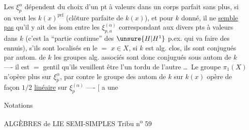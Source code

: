 Les $\xi_p^\alpha$ dépendent du choix d'un  pt  à valeurs dans un corps parfait sans plus, si on veut les $k(x)^{\mathrm{prf}}$\deleted{\unsure{,}} (clôture parfaite de $k(x)$), et pour $k$ donné, il ne \uline{semble pas} qu'il y ait  des isom entre les $\xi_{p,a}^{(\alpha)}$ correspondant aux divers pts à valeurs dans $k$ (c'est la ``partie continue'' des $\unsure{H|H^1}$ p.ex. qui va faire des ennuis), s'ils sont localisés en le $=$ $x\in X$,   si $k$ est alg. clos, ils sont conjugués par autom. de $k$  les groupes alg. associés sont donc conjugués sous autom de $k$ ---- il est $=$ gentil qu'ils veuillent être l'un tordu de l'autre \ldots\ Le groupe $\pi_1(X)$ n'opère plus sur $\xi_p^\alpha$,
par contre le groupe des autom de $k$ sur $k(x)$ \deleted{\unsure{[ou = de $k$|[ou = de $k$,}}
\deleted{\unsure{il existe]}} opère de façon $1/2$ \uline{linéaire} sur $\xi_p^{(\alpha)}$ ---- [ a une 

Notations

ALGÈBRES de LIE SEMI-SIMPLES \hfill Tribu n\textsuperscript{o} 59

